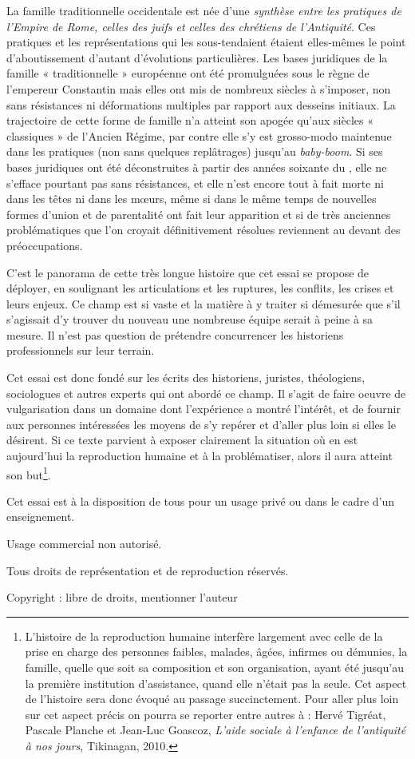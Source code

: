 La famille traditionnelle occidentale est
née d'une \emph{synthèse entre les pratiques de l'Empire de Rome, celles des
juifs et celles des chrétiens de l'Antiquité}. Ces pratiques et les représentations
qui les sous-tendaient étaient elles-mêmes le point d'aboutissement
d'autant d'évolutions particulières.
Les bases juridiques de la famille « traditionnelle » européenne ont été promulguées sous le règne
de l'empereur Constantin mais elles ont mis de nombreux
siècles à s'imposer, non sans résistances ni déformations multiples par
rapport aux desseins initiaux. La trajectoire de cette forme de famille n'a atteint son apogée qu'aux
siècles « classiques » de l'Ancien Régime, par contre elle s'y est grosso-modo maintenue dans les pratiques (non sans quelques replâtrages) jusqu'au
\emph{baby-boom}.  Si ses bases juridiques ont été déconstruites à partir des années soixante du , elle ne s'efface pourtant pas sans résistances, et elle n'est encore tout à fait morte ni dans les têtes ni dans les mœurs, même si dans le même temps de nouvelles formes d'union et de parentalité ont fait leur apparition et si de très anciennes problématiques que l'on croyait définitivement résolues reviennent au devant des préoccupations. 

C'est le panorama de cette très longue histoire que cet essai se propose de déployer, en soulignant les articulations et les ruptures, les
conflits, les crises et leurs enjeux. Ce champ est si vaste et la matière à y traiter  si démesurée que s'il s'agissait d'y trouver du nouveau une nombreuse équipe serait à peine à sa mesure. Il n'est pas question de prétendre concurrencer les historiens professionnels sur leur terrain. 

Cet essai est donc fondé sur les écrits des historiens, juristes, théologiens, sociologues et autres experts qui ont abordé ce champ. Il s'agit de faire oeuvre de vulgarisation dans un domaine dont l'expérience a montré l'intérêt, et de fournir aux personnes intéressées les moyens de s'y repérer et d'aller plus loin si elles le désirent. Si ce texte parvient à exposer clairement la situation où en est aujourd'hui la reproduction humaine et à la problématiser, alors il aura atteint son but\footnote{L'histoire de la reproduction humaine interfère largement avec celle
de la prise en charge des personnes faibles, malades, âgées, infirmes ou
démunies, la famille, quelle que soit sa composition et son organisation, ayant été jusqu'au  la première institution
d'assistance, quand elle n'était pas la seule. Cet aspect de l'histoire sera donc évoqué
au passage succinctement. Pour aller plus loin sur cet aspect précis on
pourra se reporter entre autres à : Hervé Tigréat, Pascale Planche et Jean-Luc Goascoz, \emph{L'aide sociale à l'enfance de l'antiquité à nos jours}, Tikinagan, 2010.}.

Cet essai est à la disposition de tous pour un usage privé ou dans le cadre d'un enseignement. 

Usage commercial non autorisé. 

Tous droits de représentation et de reproduction réservés.

Copyright : libre de droits, mentionner l'auteur


